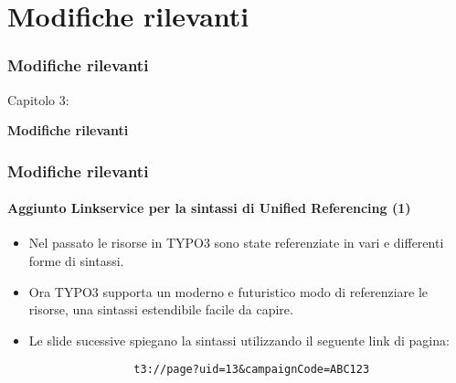 %

\section{Modifiche rilevanti}
\begin{frame}[fragile]
	\frametitle{Modifiche rilevanti}

	\begin{center}\huge{Capitolo 3:}\end{center}
	\begin{center}\huge{\color{typo3darkgrey}\textbf{Modifiche rilevanti}}\end{center}

\end{frame}

\begin{frame}[fragile]
	\frametitle{Modifiche rilevanti}
	\framesubtitle{Aggiunto Linkservice per la sintassi di Unified Referencing (1)}

	\begin{itemize}

		\item Nel passato le risorse in TYPO3 sono state referenziate in vari e differenti forme di sintassi.

		\item Ora TYPO3 supporta un moderno e futuristico modo di referenziare le risorse, una sintassi estendibile 
			facile da capire.

		\item Le slide sucessive spiegano la sintassi utilizzando il seguente link di pagina:

			\begin{lstlisting}
				t3://page?uid=13&campaignCode=ABC123
			\end{lstlisting}

	\end{itemize}

\end{frame}

